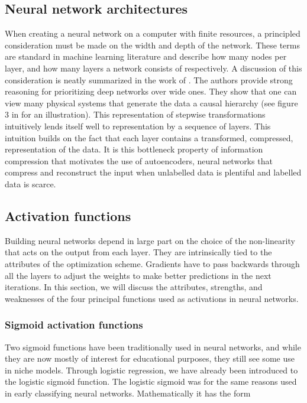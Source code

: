 \subsection{Neural network architectures}

When creating a neural network on a computer with finite resources, a principled consideration must be made on the width and depth of the network. These terms are standard in machine learning literature and describe how many nodes per layer, and how many layers a network consists of respectively. A discussion of this consideration is neatly summarized in the work of \citet{Lin2017}. The authors provide strong reasoning for prioritizing deep networks over wide ones. They show that one can view many physical systems that generate the data a causal hierarchy (see figure 3 in \citet{Lin2017} for an illustration). This representation of stepwise transformations intuitively lends itself well to representation by a sequence of layers. This intuition builds on the fact that each layer contains a transformed, compressed, representation of the data. It is this bottleneck property of information compression that motivates the use of autoencoders, neural networks that compress and reconstruct the input when unlabelled data is plentiful and labelled data is scarce.

\subsection{Activation functions}\label{sec:activation}

Building neural networks depend in large part on the choice of the non-linearity that acts on the output from each layer. They are intrinsically tied to the attributes of the optimization scheme. Gradients have to pass backwards through all the layers to adjust the weights to make better predictions in the next iterations. In this section, we will discuss the attributes, strengths, and weaknesses of the four principal functions used as activations in neural networks. 

\subsubsection{Sigmoid activation functions}

Two sigmoid functions have been traditionally used in neural networks, and while they are now mostly of interest for educational purposes, they still see some use in niche models. Through logistic regression, we have already been introduced to the logistic sigmoid function. The logistic sigmoid was for the same reasons used in early classifying neural networks. Mathematically it has the form 


